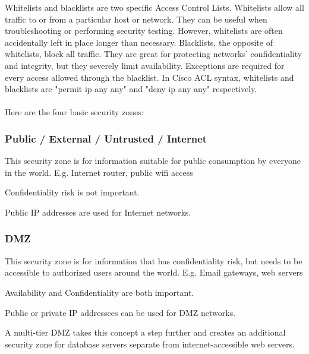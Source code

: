 Whitelists and blacklists are two specific Access Control Lists. Whitelists allow all traffic to or from a particular host or network. They can be useful when troubleshooting or performing security testing. However, whitelists are often accidentally left in place longer than necessary. Blacklists, the opposite of whitelists, block all traffic. They are great for protecting networks' confidentiality and integrity, but they severely limit availability. Exceptions are required for every access allowed through the blacklist. In Cisco ACL syntax, whitelists and blacklists are "permit ip any any" and "deny ip any any" respectively.\\\\
Here are the four basic security zones:
\subsubsection{Public / External / Untrusted / Internet}
\begin{description}
\item This security zone is for information suitable for public consumption by everyone in the world. E.g. Internet router, public wifi access
\item Confidentiality risk is not important.
\item Public IP addresses are used for Internet networks.
\end{description}
\subsubsection{DMZ}
\begin{description}
\item This security zone is for information that has confidentiality risk, but needs to be accessible to authorized users around the world. E.g. Email gateways, web servers
\item Availability and Confidentiality are both important.
\item Public or private IP addressees can be used for DMZ networks.
\item A multi-tier DMZ takes this concept a step further and creates an additional security zone for database servers separate from internet-accessible web servers.
\end{description}
